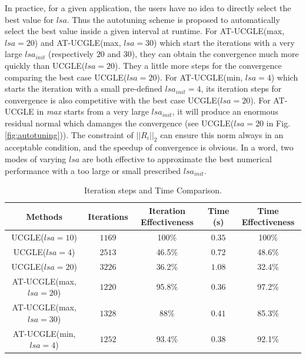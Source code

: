 In practice, for a given application, the users have no idea to directly select the best value for $lsa$. Thus the autotuning scheme is proposed to automatically select the best value inside a given interval at runtime. For AT-UCGLE(max, $lsa=20$) and AT-UCGLE(max, $lsa=30$) which start the iterations with a very large $lsa_{init}$ (respectively $20$ and $30$), they can obtain the convergence much more quickly than UCGLE($lsa=20$). They a little more steps for the convergence comparing the best case UCGLE($lsa=20$). For AT-UCGLE(min, $lsa=4$) which starts the iteration with a small pre-defined $lsa_{init}=4$, its iteration steps for convergence is also competitive with the best case UCGLE($lsa=20$). For AT-UCGLE in \textit{max} starts from a very large $lsa_{init}$, it will produce an enormous residual normal which damanges the convergence (see UCGLE($lsa=20$ in Fig. \ref{fig:autotuning})). The constraint of $||R_i||_2$ can ensure this norm always in an acceptable condition, and the speedup of convergence is obvious. In a word,  two modes of varying $lsa$ are both effective to approximate the best numerical performance with a too large or small prescribed $lsa_{init}$.

\begin{table}[htbp]
	\renewcommand{\arraystretch}{1.4}
	\small	
	\caption{Iteration steps and Time Comparison.}
	\label{table:autotuning}
	\centering
	\begin{tabular}{c|c|c|c|c}
		\toprule
		\cellcolor{gray!50}Methods & \cellcolor{gray!50}Iterations & \cellcolor{gray!50}Iteration Effectiveness&\cellcolor{gray!50}Time (s) & 	\cellcolor{gray!50}Time Effectiveness\\
		\midrule
		UCGLE($lsa=10$)  & $1169$ & 100\%& $0.35$ &100\%\\
		\cellcolor{gray!20}UCGLE($lsa=4$) & \cellcolor{gray!20}$2513$ & \cellcolor{gray!20}46.5\%& \cellcolor{gray!20}$0.72$  &\cellcolor{gray!20}48.6\% \\
		UCGLE($lsa=20$) & $3226$ &36.2\%& $1.08$& 32.4\%\\
		\cellcolor{gray!20}AT-UCGLE(max, $lsa=20$) & \cellcolor{gray!20}$1220$ & \cellcolor{gray!20}95.8\%& \cellcolor{gray!20}$0.36$ &\cellcolor{gray!20}97.2\%\\
		AT-UCGLE(max, $lsa=30$)  &$1328$ & 88\%&$0.41$ &85.3\% \\
		 \cellcolor{gray!20}AT-UCGLE(min, $lsa=4$) &  \cellcolor{gray!20}$1252$ & \cellcolor{gray!20}93.4\%&  \cellcolor{gray!20}$0.38$ &\cellcolor{gray!20}92.1\%\\
		
		\bottomrule
	\end{tabular}
\end{table}

